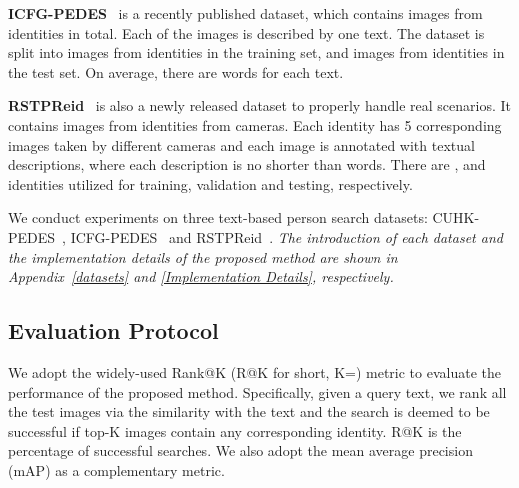 \documentclass{article}
\begin{document}
\noindent\textbf{ICFG-PEDES}~\cite{ding2021semantically} is a recently published dataset, which contains  images from  identities in total. Each of the images is described by one text. The dataset is split into  images from  identities in the training set, and  images from  identities in the test set. On average, there are  words for each text.

\noindent\textbf{RSTPReid}~\cite{zhu2021dssl} is also a newly released dataset to properly handle real scenarios. It contains  images from  identities from  cameras. Each identity has 5 corresponding images taken by different cameras and each image is annotated with  textual descriptions, where each description is no shorter than  words. There are ,  and  identities utilized for training, validation and testing, respectively.
\fi

We conduct experiments on three text-based person search datasets: CUHK-PEDES~\cite{li2017person}, ICFG-PEDES~\cite{ding2021semantically} and RSTPReid~\cite{zhu2021dssl}.
\emph{The introduction of each dataset and the implementation details of the proposed method are shown in Appendix~\ref{datasets} and \ref{Implementation Details}, respectively.}

\subsection{Evaluation Protocol}
We adopt the widely-used Rank@K (R@K for short, K=) metric to evaluate the performance of the proposed method. 
Specifically, given a query text, we rank all the test images via the similarity with the text and the search is deemed to be successful if top-K images contain any corresponding identity. R@K is the percentage of successful searches. 
We also adopt the mean average precision (mAP) as a complementary metric.
\end{document}
